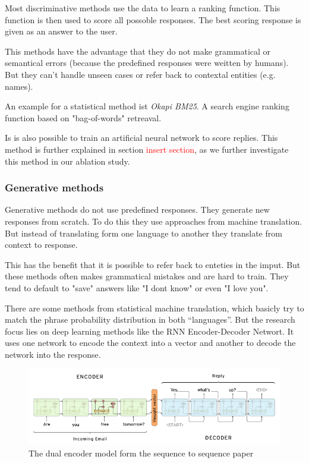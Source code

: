 \documentclass[conference]{IEEEtran}
\newcommand\note[1]{\textcolor{red}{#1}}
\begin{document}
Most discriminative methods use the data to learn a ranking function. This function is then used to score all possoble responses. The best scoring response is given as an answer to the user.\cite{yan2016shall}

This methods have the advantage that they do not make grammatical or semantical errors (because the predefined responses were weitten by humans). But they can't handle unseen cases or refer back to contextal entities (e.g. names).

An example for a statistical method ist \emph{Okapi BM25}\cite{manning2008introduction}. A search engine ranking function based on "bag-of-words" retreaval.

Is is also possible to train an artificial neural network to score replies\cite{yan2016shall,lowe2015ubuntu}. This method is further explained in section \note{insert section}, as we further investigate this method in our ablation study.

\subsubsection{Generative methods}
Generative methods do not use predefined responses. They generate new responses from scratch. To do this they use approaches from machine translation. But instead of translating form one language to another they translate from context to response.

This has the benefit that it is possible to refer back to enteties in the imput. But these methods often makes grammatical mistakes and are hard to train. They tend to default to "save" answers like "I dont know" or even "I love you".\

There are some methods from statistical machine translation, which basicly try to match the phrase probability distribution in both “languages”. But the research focus lies on deep learning methods like the RNN Encoder-Decoder Networt\cite{sutskever2014sequence}. It uses one network to encode the context into a vector and another to decode the network into the response.

\begin{figure}[H]
\centering
   \includegraphics[width=\linewidth]{sequence_to_sequence.png}
  \caption{The dual encoder model form the sequence to sequence paper\cite{sutskever2014sequence}}
  \label{fig:dstChallengeProbabilistic}
\end{figure}
\end{document}
